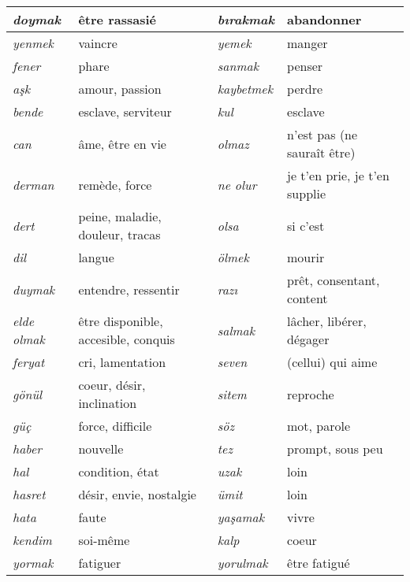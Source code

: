 \documentclass{cours}
\newcommand{\ch}{\c{s}}
\begin{document}
\begin{longtable}{>{\sl}p{}p{}|>{\sl}p{}p{}}
    \midrule
    doymak           & être rassasié                       & b\i rakmak     & abandonner                    \\
    \midrule
    yenmek           & vaincre                             & yemek          & manger                        \\
    \midrule
    fener            & phare                               & sanmak         & penser                        \\
    \midrule
    a\ch k           & amour, passion                      & kaybetmek      & perdre                        \\
    \midrule
    bende            & esclave, serviteur                  & kul            & esclave                       \\
    \midrule
    can              & âme, être en vie                    & olmaz          & n'est pas (ne sauraît être)   \\
    \midrule
    derman           & remède, force                       & ne olur        & je t'en prie, je t'en supplie \\
    dert             & peine, maladie, douleur, tracas     & olsa           & si c'est                      \\
    \midrule
    dil              & langue                              & ölmek          & mourir                        \\
    \midrule
    duymak           & entendre, ressentir                 & raz\i          & prêt, consentant, content     \\
    \midrule
    elde olmak       & être disponible, accesible, conquis & salmak         & lâcher, libérer, dégager      \\
    \midrule
    feryat           & cri, lamentation                    & seven          & (cellui) qui aime             \\
    \midrule
    gönül            & coeur, désir, inclination           & sitem          & reproche                      \\
    \midrule
    güç              & force, difficile                    & söz            & mot, parole                   \\
    \midrule
    haber            & nouvelle                            & tez            & prompt, sous peu              \\
    \midrule
    hal              & condition, état                     & uzak           & loin                          \\
    \midrule
    hasret           & désir, envie, nostalgie             & ümit           & loin                          \\
    \midrule
    hata             & faute                               & ya\ch amak     & vivre                         \\
    \midrule
    kendim           & soi-même                            & kalp           & coeur                         \\
    \midrule
    yormak           & fatiguer                            & yorulmak       & être fatigué
\end{longtable}
\end{document}
